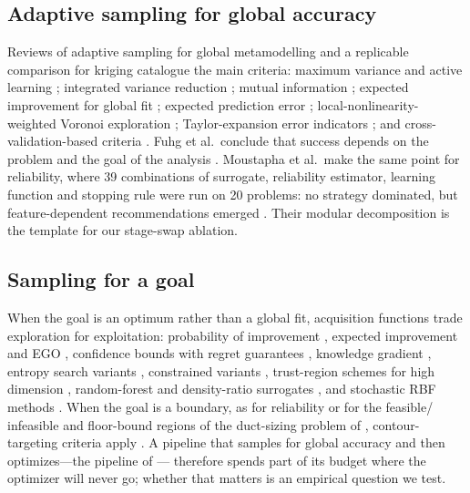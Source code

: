 \subsection{Adaptive sampling for global accuracy}
Reviews of adaptive sampling for global metamodelling \cite{liu2018survey,garud2017design,settles2009active} and a
replicable comparison for kriging \cite{fuhg2021state} catalogue the main criteria: maximum variance and active
learning \cite{mackay1992information}; integrated variance reduction \cite{cohn1996active}; mutual information
\cite{krause2008near}; expected improvement for global fit \cite{lam2008sequential}; expected prediction error
\cite{liu2017efficient}; local-nonlinearity-weighted Voronoi exploration \cite{crombecq2011novel}; Taylor-expansion
error indicators \cite{mo2017taylor}; and cross-validation-based criteria \cite{legratiet2014recursive}. Fuhg et al.\
conclude that success depends on the problem and the goal of the analysis \cite{fuhg2021state}. Moustapha et al.\ make the
same point for reliability, where 39 combinations of surrogate, reliability estimator, learning function and stopping
rule were run on 20 problems: no strategy dominated, but feature-dependent recommendations emerged
\cite{moustapha2022active}. Their modular decomposition is the template for our stage-swap ablation.

\subsection{Sampling for a goal}
When the goal is an optimum rather than a global fit, acquisition functions trade exploration for exploitation:
probability of improvement \cite{kushner1964new}, expected improvement and EGO \cite{jones1998efficient}, confidence
bounds with regret guarantees \cite{srinivas2010gaussian}, knowledge gradient \cite{frazier2009knowledge}, entropy
search variants \cite{hennig2012entropy,wang2017max}, constrained variants \cite{gardner2014bayesian}, trust-region
schemes for high dimension \cite{eriksson2019scalable}, random-forest and density-ratio surrogates
\cite{hutter2011sequential,bergstra2011algorithms}, and stochastic RBF methods
\cite{regis2007stochastic,regis2013combining}. When the goal is a boundary, as for reliability or for the feasible/
infeasible and floor-bound regions of the duct-sizing problem of \cite[Sec.~14.3]{poznanski2026towards}, contour-targeting criteria apply
\cite{bichon2008efficient,echard2011akmcs}. A pipeline that samples for global accuracy and then optimizes---the pipeline of \cite[Sec.~14.3]{poznanski2026towards}---
therefore spends part of its budget where the optimizer will never go; whether that matters is an empirical
question we test.
